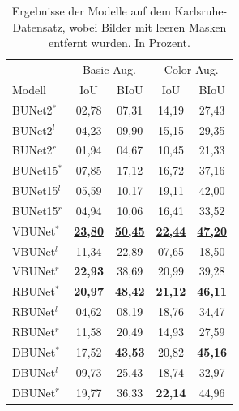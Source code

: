 \begin{table}[ht]
	\centering
	\begin{tabular}{l|cc|cc}
		& \multicolumn{2}{c|}{Basic Aug.} & \multicolumn{2}{c}{Color Aug.} \\ 
		Modell & \ac{IoU} & \ac{BIoU}  & \ac{IoU} & \ac{BIoU}  \\
		\midrule
        BUNet2$^*$ & 02,78 & 07,31  &  14,19 & 27,43 \\
        BUNet2$^l$ & 04,23 & 09,90  &  15,15 & 29,35 \\
        BUNet2$^r$ & 01,94 & 04,67  &  10,45 & 21,33 \\
		\midrule

        BUNet15$^*$ & 07,85 & 17,12  &  16,72 & 37,16 \\
        BUNet15$^l$ & 05,59 & 10,17  &  19,11 & 42,00 \\
        BUNet15$^r$ & 04,94 & 10,06  &  16,41 & 33,52 \\
		\midrule

        VBUNet$^*$ & \underline{\textbf{23,80}} & \underline{\textbf{50,45}} &  \underline{\textbf{22,44}} & \underline{\textbf{47,20}} \\
        VBUNet$^l$ & 11,34 & 22,89 &  07,65 & 18,50 \\
        VBUNet$^r$ & \textbf{22,93} & 38,69 &  20,99 & 39,28 \\
		\midrule

        RBUNet$^*$ & \textbf{20,97} & \textbf{48,42} &  \textbf{21,12} & \textbf{46,11} \\
        RBUNet$^l$ & 04,62 & 08,19 &  18,76 & 34,47 \\
        RBUNet$^r$ & 11,58 & 20,49 &  14,93 & 27,59 \\
		\midrule

        DBUNet$^*$ & 17,52 & \textbf{43,53} &  20,82 & \textbf{45,16} \\
        DBUNet$^l$ & 09,73 & 25,43 &  18,74 & 32,97 \\
        DBUNet$^r$ & 19,77 & 36,33 &  \textbf{22,14} & 44,96 \\
        
	\end{tabular}
	\caption{Ergebnisse der Modelle auf dem Karlsruhe-Datensatz, wobei Bilder mit leeren Masken entfernt wurden. 
    In Prozent.}
	\label{tab:results-ka-small}
\end{table}

